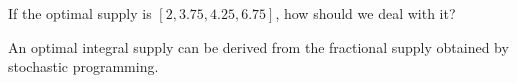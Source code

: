 
If the optimal supply is $[2, 3.75, 4.25, 6.75]$, how should we deal with it?

\begin{thm}
An optimal integral supply can be derived from the fractional supply obtained by stochastic programming.
\end{thm}










